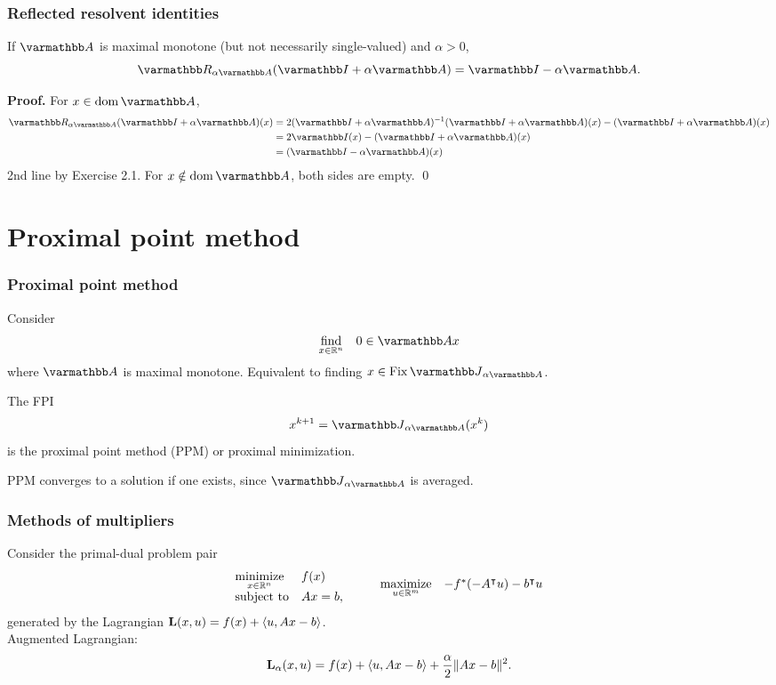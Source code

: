 \documentclass[10pt,mathserif]{beamer}
\begin{document}
\begin{frame}[label=refl-identities]
\frametitle{Reflected resolvent identities}
If $\opA$ is maximal monotone (but not necessarily single-valued)
and $\alpha> 0$,
\[
\opR_{\alpha \opA}(\opI+\alpha \opA)
=\opI-\alpha \opA.
\]

\vspace{0.2in}

\textbf{Proof.}
For $x\in \dom \opA$,
\begin{align*}
\opR_{\alpha \opA}(\opI+\alpha \opA)(x)
&=2(\opI+\alpha \opA)^{-1}(\opI+\alpha \opA)(x)
-(\opI+\alpha \opA)(x)\\
&=2\opI(x)-(\opI+\alpha \opA)(x)\\
&=(\opI-\alpha \opA)(x)
\end{align*}
2nd line by Exercise 2.1.
For $x\notin \dom \opA$, both sides are empty.
\qed
\end{frame}


\section{Proximal point method}
\begin{frame}
\frametitle{Proximal point method}
Consider
\[
\begin{array}{ll}
\underset{x\in \reals^n}{\mbox{find}}&0\in \opA x
\end{array}
\]
where $\opA$ is maximal monotone.
Equivalent to finding $x\in \fix\opJ_{\alpha \opA}$.

\vspace{0.2in}
The FPI
\[
x^{k+1} = \opJ_{\alpha \opA}(x^k)
\]
is the proximal point method (PPM) or proximal minimization.

\vspace{0.2in}
PPM converges to a solution if one exists, since $\opJ_{\alpha \opA}$ is averaged.
\end{frame}


\begin{frame}
\frametitle{Methods of multipliers}
Consider the primal-dual problem pair
\[
\begin{array}{ll}
\underset{x\in \mathbb{R}^n}{\mbox{minimize}} &f(x)\\
\mbox{subject to} &Ax=b,
\end{array}
\qquad
\begin{array}{ll}
\underset{u\in\mathbb{R}^m}{\mbox{maximize}}&- f^*(-A^\intercal u)-b^\intercal u
\end{array}
\]
generated by the Lagrangian $\mathbf{L}(x,u)=f(x)+\langle u,Ax-b\rangle$.\\

\vspace{0.2in}
Augmented Lagrangian:
\[
\mathbf{L}_\alpha(x,u)=f(x)+\langle u,Ax-b\rangle+\frac{\alpha}{2}\|Ax-b\|^2.
\]
\end{frame}
\end{document}
